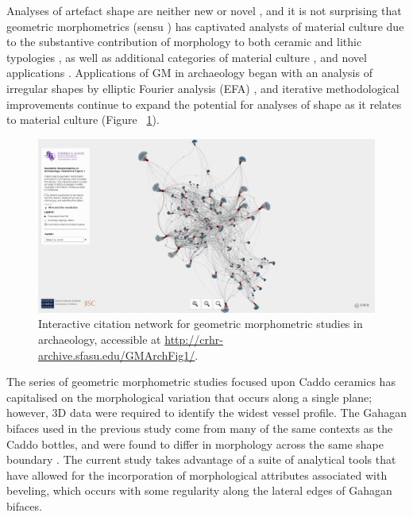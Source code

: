 \documentclass[review]{elsarticle}
\begin{document}
Analyses of artefact shape are neither new or novel \citep{RN11779}, and it is not surprising that geometric morphometrics (sensu \citet{RN11559}) has captivated analysts of material culture due to the substantive contribution of morphology to both ceramic \citep{RN1752,RN11631,RN4335} and lithic typologies \citep{RN11529,RN11528,RN20853,RN11534}, as well as additional categories of material culture \citep{RN1737,RN4374,RN11527}, and novel applications \citep{RN11543,RN11544}. Applications of GM in archaeology began with an analysis of irregular shapes by elliptic Fourier analysis (EFA) \citep{RN4379}, and iterative methodological improvements continue to expand the potential for analyses of shape as it relates to material culture (Figure ~\ref{fig:network}).

\begin{figure}[ht]\centering
\includegraphics[width=\linewidth]{fignet.png}
\caption{Interactive citation network for geometric morphometric studies in archaeology, accessible at \href{http://crhr-archive.sfasu.edu/GMArchFig1/}{http://crhr-archive.sfasu.edu/GMArchFig1/}.}
\label{fig:network}
\end{figure}

The series of geometric morphometric studies focused upon Caddo ceramics has capitalised on the morphological variation that occurs along a single plane; however, 3D data were required to identify the widest vessel profile. The Gahagan bifaces used in the previous study come from many of the same contexts as the Caddo bottles, and were found to differ in morphology across the same shape boundary \citep[Figure 15.1]{RN11783,RN20852}. The current study takes advantage of a suite of analytical tools that have allowed for the incorporation of morphological attributes associated with beveling, which occurs with some regularity along the lateral edges of Gahagan bifaces.
\end{document}
